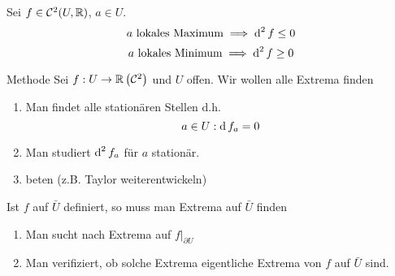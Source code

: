 \begin{Sat}
  Sei $f\in\mathcal{C}^2(U,\mathbb{R})$, $a\in U$.
  \[a\ \text{lokales Maximum} \implies \operatorname{d}^2f\leq 0\]
  \[a\ \text{lokales Minimum} \implies \operatorname{d}^2f\geq 0\]
\end{Sat}
\begin{Bem}{Methode}
  Sei $f:U\to\mathbb{R}\left( \mathcal{C}^2 \right)$ und $U$ offen. Wir wollen alle Extrema finden
  \begin{enumerate}
    \item Man findet alle stationären Stellen d.h.
      \[a\in U:\operatorname{d} f_a=0\]
    \item Man studiert $\operatorname{d}^2f_a$ für $a$ stationär.
    \item beten (z.B. Taylor weiterentwickeln)
  \end{enumerate}
  Ist $f$ auf $\bar U$ definiert, so muss man Extrema auf $\bar U$ finden
  \begin{enumerate}
    \item Man sucht nach Extrema auf $f|_{\partial U}$
    \item Man verifiziert, ob solche Extrema eigentliche Extrema von $f$ auf $\bar U$ sind.
  \end{enumerate}
\end{Bem}
